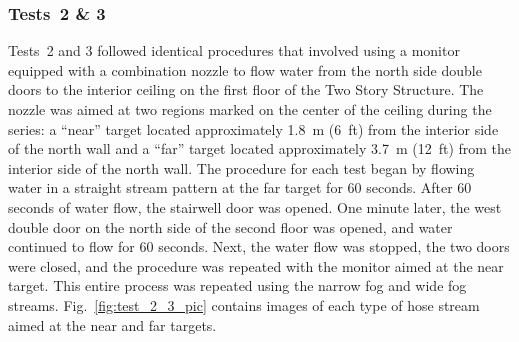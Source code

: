\documentclass[12pt,oneside]{book}
\begin{document}
\subsubsection{Tests~2 \& 3}
Tests~2 and 3 followed identical procedures that involved using a monitor equipped with a combination nozzle to flow water from the north side double doors to the interior ceiling on the first floor of the Two Story Structure. The nozzle was aimed at two regions marked on the center of the ceiling during the series: a ``near'' target located approximately 1.8~m (6~ft) from the interior side of the north wall and a ``far'' target located approximately 3.7~m (12~ft) from the interior side of the north wall. The procedure for each test began by flowing water in a straight stream pattern at the far target for 60 seconds. After 60 seconds of water flow, the stairwell door was opened. One minute later, the west double door on the north side of the second floor was opened, and water continued to flow for 60 seconds. Next, the water flow was stopped, the two doors were closed, and the procedure was repeated with the monitor aimed at the near target. This entire process was repeated using the narrow fog and wide fog streams. Fig.~\ref{fig:test_2_3_pic} contains images of each type of hose stream aimed at the near and far targets.
\end{document}
